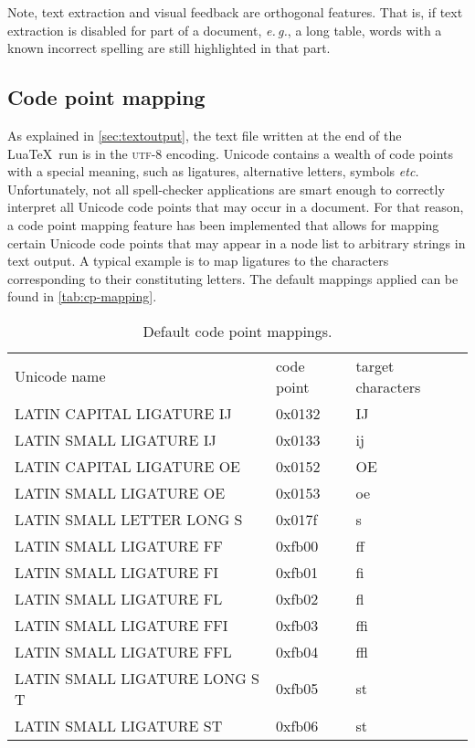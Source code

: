 \documentclass[11pt]{article}
\newcommand*{\acr}[1]{\mbox{\scshape#1}}
\newcommand*{\latinphrase}[1]{\foreignlanguage{latin}{\emph{#1}}}
\newcommand*{\lpeg}{\latinphrase{e.\,g.}\xspace}
\newcommand*{\lpetc}{\latinphrase{etc.}\xspace}
\begin{document}
Note, text extraction and visual feedback are orthogonal features.  That
is, if text extraction is disabled for part of a document, \lpeg, a long
table, words with a known incorrect spelling are still highlighted in
that part.


\subsection{Code point mapping}
\label{sec:cp-mapping}

As explained in \autoref{sec:textoutput}, the text file written at the
end of the Lua\TeX\ run is in the \acr{utf-8} encoding.  Unicode
contains a wealth of code points with a special meaning, such as
ligatures, alternative letters, symbols \lpetc Unfortunately, not all
spell-checker applications are smart enough to correctly interpret all
Unicode code points that may occur in a document.  For that reason, a
code point mapping feature has been implemented that allows for mapping
certain Unicode code points that may appear in a node list to arbitrary
strings in text output.  A typical example is to map ligatures to the
characters corresponding to their constituting letters.  The default
mappings applied can be found in \autoref{tab:cp-mapping}.

\begin{table}
  \centering

  \begin{tabular}{>{\ttfamily}l>{\ttfamily}l>{\ttfamily}l}
    \normalfont Unicode name & \normalfont code point & \normalfont target characters\\
    \addlinespace
    \toprule
    \addlinespace

    LATIN CAPITAL LIGATURE IJ & 0x0132 & IJ\\
    LATIN SMALL LIGATURE IJ & 0x0133 & ij\\
    LATIN CAPITAL LIGATURE OE & 0x0152 & OE\\
    LATIN SMALL LIGATURE OE & 0x0153 & oe\\
    LATIN SMALL LETTER LONG S & 0x017f & s\\
    LATIN SMALL LIGATURE FF & 0xfb00 & ff\\
    LATIN SMALL LIGATURE FI & 0xfb01 & fi\\
    LATIN SMALL LIGATURE FL & 0xfb02 & fl\\
    LATIN SMALL LIGATURE FFI & 0xfb03 & ffi\\
    LATIN SMALL LIGATURE FFL & 0xfb04 & ffl\\
    LATIN SMALL LIGATURE LONG S T & 0xfb05 & st\\
    LATIN SMALL LIGATURE ST & 0xfb06 & st\\
  \end{tabular}

  \caption{Default code point mappings.}
  \label{tab:cp-mapping}

\end{table}
\end{document}

